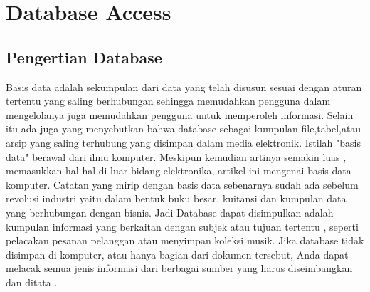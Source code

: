 
\section {Database Access}

\subsection {Pengertian Database}
	Basis data adalah sekumpulan dari data yang telah disusun sesuai dengan aturan tertentu yang saling berhubungan sehingga memudahkan pengguna dalam mengelolanya juga memudahkan pengguna untuk memperoleh informasi. Selain itu ada juga yang menyebutkan bahwa database sebagai kumpulan ﬁle,tabel,atau arsip yang saling terhubung yang disimpan dalam media elektronik.
	Istilah "basis data" berawal dari ilmu komputer. Meskipun kemudian artinya semakin luas , memasukkan hal-hal di luar bidang elektronika, artikel ini mengenai basis data komputer. Catatan yang mirip dengan basis data sebenarnya sudah ada sebelum revolusi industri yaitu dalam bentuk buku besar, kuitansi dan kumpulan data yang berhubungan dengan bisnis.
	Jadi Database dapat disimpulkan adalah kumpulan informasi yang berkaitan dengan subjek atau tujuan tertentu , seperti pelacakan pesanan pelanggan atau menyimpan koleksi musik. Jika database tidak disimpan di komputer, atau hanya bagian dari dokumen tersebut, Anda dapat melacak semua jenis informasi dari berbagai sumber yang harus diseimbangkan dan ditata .

